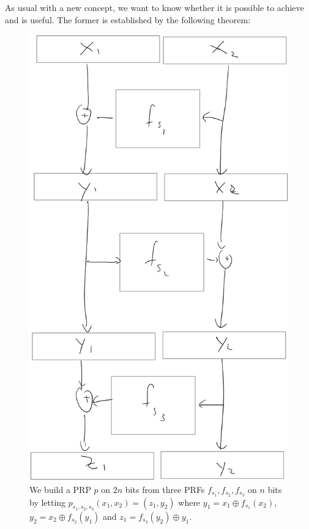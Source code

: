 As usual with a new concept, we want to know whether it is possible to
achieve and is useful. The former is established by the following
theorem:

\hypertarget{PRPfromPRF}{}

\begin{figure}
\centering
\includegraphics[width=\textwidth, height=0.25\paperheight, keepaspectratio]{../figure/feistel.jpg}
\caption{We build a PRP \(p\) on \(2n\) bits from three PRFs
\(f_{s_1},f_{s_2},f_{s_3}\) on \(n\) bits by letting
\(p_{s_1,s_2,s_3}(x_1,x_2)=(z_1,y_2)\) where
\(y_1 = x_1 \oplus f_{s_1}(x_2)\), \(y_2 = x_2 \oplus f_{s_2}(y_1)\) and
\(z_1 = f_{s_3}(y_2) \oplus y_1\).}
\label{feistelfig}
\end{figure}

